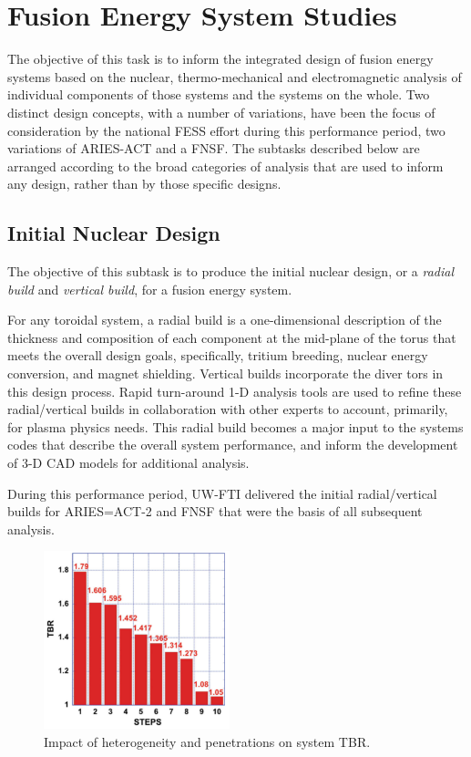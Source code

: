 \section{Fusion Energy System Studies}

The objective of this task is to inform the integrated design of fusion energy
systems based on the nuclear, thermo-mechanical and electromagnetic analysis
of individual components of those systems and the systems on the whole.  Two
distinct design concepts, with a number of variations, have been the focus of
consideration by the national \gls{FESS} effort during this performance
period, two variations of ARIES-ACT and a \gls{FNSF}.  The subtasks described
below are arranged according to the broad categories of analysis that are used
to inform any design, rather than by those specific designs.

\subsection{Initial Nuclear Design}

The objective of this subtask is to produce the initial nuclear design, or a
\emph{radial build} and \emph{vertical build}, for a fusion energy system.

For any toroidal system, a radial build is a one-dimensional description of
the thickness and composition of each component at the mid-plane of the torus
that meets the overall design goals, specifically, tritium breeding, nuclear
energy conversion, and magnet shielding.  Vertical builds incorporate the
diver tors in this design process.  Rapid turn-around 1-D analysis tools are
used to refine these radial/vertical builds in collaboration with other
experts to account, primarily, for plasma physics needs.  This radial build
becomes a major input to the systems codes that describe the overall system
performance, and inform the development of 3-D CAD models for additional
analysis.

During this performance period, \gls{UW-FTI} delivered the initial
radial/vertical builds for ARIES=ACT-2 and \gls{FNSF} that were the basis of
all subsequent analysis.

\begin{figure}
\centering
\includegraphics[width=0.48\textwidth]{imgs/aries-act-2-tbr.png}
\caption{\label{fig:aries-act-2-tbr}Impact of heterogeneity and penetrations on system \gls{TBR}.}
\end{figure}


